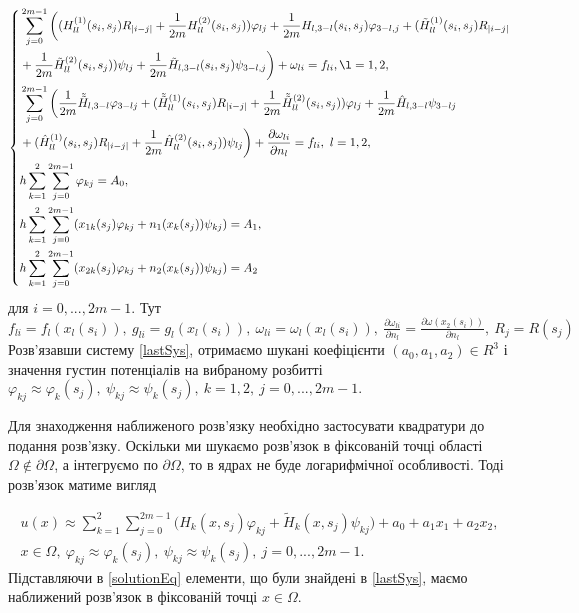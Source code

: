 \documentclass[12pt]{report}
\begin{document}
  \begin{equation} \label{lastSys}
  \left\{
  \begin{split}
  	&\sum_{j=0}^{2m-1}\bigg((H^{(1)}_{ll}(s_i, s_j)R_{|i-j|}+\frac{1}{2m}H^{(2)}_{ll}(s_i, s_j))\varphi_{lj}+\frac{1}{2m}H_{l,3-l}(s_i, s_j)\varphi_{3-l,j} +(\tilde{H}^{(1)}_{ll}(s_i, s_j)R_{|i-j|} \\
	&+\frac{1}{2m}\tilde{H}^{(2)}_{ll}(s_i, s_j))\psi_{lj}+\frac{1}{2m}\tilde{H}_{l,3-l}(s_i, s_j)\psi_{3-l,j}\bigg) + \omega_{li}=f_{li},\l=1,2, \\
	 &\sum_{j=0}^{2m-1}\bigg(\frac{1}{2m}\tilde{\tilde{H}}_{l,3-l}\varphi_{3-lj}+(\tilde{\tilde{H}}^{(1)}_{ll}(s_i, s_j)R_{|i-j|}+\frac{1}{2m}\tilde{\tilde{H}}^{(2)}_{ll}(s_i, s_j))\varphi_{lj} + \frac{1}{2m}\hat{H}_{l,3-l}\psi_{3-lj}\\
	 &+(\hat{H}^{(1)}_{ll}(s_i, s_j)R_{|i-j|}+\frac{1}{2m}\hat{H}^{(2)}_{ll}(s_i, s_j))\psi_{lj}\bigg) +\frac{\partial\omega_{li}}{\partial n_l}=f_{li},\ l=1,2,\\
	 &h\sum_{k=1}^{2}\sum_{j=0}^{2m-1}\varphi_{kj}=A_0, \\
	 &h\sum_{k=1}^{2}\sum_{j=0}^{2m-1}(x_{1k}(s_j)\varphi_{kj}+n_1(x_k(s_j))\psi_{kj})=A_1, \\
	 &h\sum_{k=1}^{2}\sum_{j=0}^{2m-1}(x_{2k}(s_j)\varphi_{kj}+n_2(x_k(s_j))\psi_{kj})=A_2
\end{split}
\right.
\end{equation}
для $i=0,...,2m-1$. Тут $f_{li}=f_l(x_l(s_i)), \ g_{li}=g_l(x_l(s_i)), \ \omega_{li}=\omega_l(x_l(s_i)), \ \frac{\partial\omega_{li}}{\partial n_l}=\frac{\partial\omega(x_2(s_i))}{\partial n_l}, \ R_j=R(s_j)$
Розв'язавши систему \eqref{lastSys}, отримаємо шукані коефіцієнти $(a_0,a_1,a_2)\in R^3$ і значення густин потенціалів на вибраному розбитті $\varphi_{kj}\approx\varphi_k(s_j), \ \psi_{kj}\approx\psi_k(s_j), \ k=1,2, \ j=0,...,2m-1.$

Для знаходження наближеного розв'язку необхідно застосувати квадратури до подання розв'язку. Оскільки ми шукаємо розв'язок в фіксованій точці області $\Omega\notin\partial\Omega$, а інтегруємо по $\partial\Omega$, то в ядрах не буде логарифмічної особливості. Тоді розв'язок матиме вигляд

 \begin{equation} \label{solutionEq}
 \begin{split}
 	u(x) \approx\sum_{k=1}^{2}\sum_{j=0}^{2m-1}\bigg(H_k(x,s_j)\varphi_{kj}+\tilde{H}_k(x,s_j)\psi_{kj}\bigg) +a_0+a_1x_1+a_2x_2,\\
 	x\in\Omega, \ \varphi_{kj}\approx\varphi_k(s_j), \ \psi_{kj}\approx\psi_k(s_j), \ j=0,...,2m-1.
 \end{split}
 \end{equation}
 Підставляючи в \eqref{solutionEq} елементи, що були знайдені в \eqref{lastSys}, маємо наближений розв'язок в фіксованій точці $x\in\Omega$.
\end{document}
